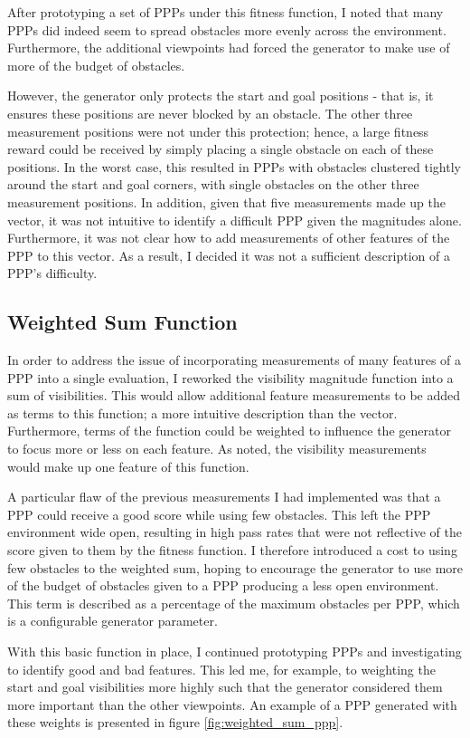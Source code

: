 \documentclass[authoryearcitations]{UoYCSproject}
\begin{document}
After prototyping a set of PPPs under this fitness function, I noted that many PPPs did indeed seem to spread obstacles more evenly across the environment. Furthermore, the additional viewpoints had forced the generator to make use of more of the budget of obstacles. 

However, the generator only protects the start and goal positions - that is, it ensures these positions are never blocked by an obstacle. The other three measurement positions were not under this protection; hence, a large fitness reward could be received by simply placing a single obstacle on each of these positions. In the worst case, this resulted in PPPs with obstacles clustered tightly around the start and goal corners, with single obstacles on the other three measurement positions. In addition, given that five measurements made up the vector, it was not intuitive to identify a difficult PPP given the magnitudes alone. Furthermore, it was not clear how to add measurements of other features of the PPP to this vector. As a result, I decided it was not a sufficient description of a PPP's difficulty.

\subsection{Weighted Sum Function}
\label{sec:weighted_sum}
In order to address the issue of incorporating measurements of many features of a PPP into a single evaluation, I reworked the visibility magnitude function into a sum of visibilities. This would allow additional feature measurements to be added as terms to this function; a more intuitive description than the vector. Furthermore, terms of the function could be weighted to influence the generator to focus more or less on each feature. As noted, the visibility measurements would make up one feature of this function.

A particular flaw of the previous measurements I had implemented was that a PPP could receive a good score while using few obstacles. This left the PPP environment wide open, resulting in high pass rates that were not reflective of the score given to them by the fitness function. I therefore introduced a cost to using few obstacles to the weighted sum, hoping to encourage the generator to use more of the budget of obstacles given to a PPP producing a less open environment. This term is described as a percentage of the maximum obstacles per PPP, which is a configurable generator parameter.

With this basic function in place, I continued prototyping PPPs and investigating to identify good and bad features. This led me, for example, to weighting the start and goal visibilities more highly such that the generator considered them more important than the other viewpoints. An example of a PPP generated with these weights is presented in figure \ref{fig:weighted_sum_ppp}.
\end{document}
